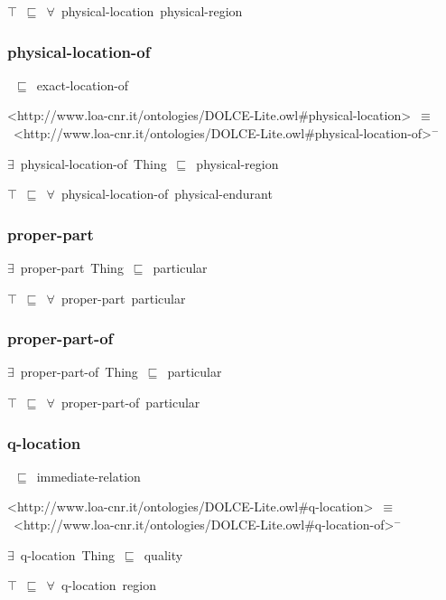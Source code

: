 \documentclass{article}
\begin{document}
\ensuremath{\top}~\ensuremath{\sqsubseteq}~\ensuremath{\forall}~physical-location~physical-region

\subsubsection*{physical-location-of}

~\ensuremath{\sqsubseteq}~exact-location-of

<http://www.loa-cnr.it/ontologies/DOLCE-Lite.owl#physical-location>~\ensuremath{\equiv}~<http://www.loa-cnr.it/ontologies/DOLCE-Lite.owl#physical-location-of>\ensuremath{^-}

\ensuremath{\exists}~physical-location-of~Thing~\ensuremath{\sqsubseteq}~physical-region

\ensuremath{\top}~\ensuremath{\sqsubseteq}~\ensuremath{\forall}~physical-location-of~physical-endurant

\subsubsection*{proper-part}

\ensuremath{\exists}~proper-part~Thing~\ensuremath{\sqsubseteq}~particular

\ensuremath{\top}~\ensuremath{\sqsubseteq}~\ensuremath{\forall}~proper-part~particular

\subsubsection*{proper-part-of}

\ensuremath{\exists}~proper-part-of~Thing~\ensuremath{\sqsubseteq}~particular

\ensuremath{\top}~\ensuremath{\sqsubseteq}~\ensuremath{\forall}~proper-part-of~particular

\subsubsection*{q-location}

~\ensuremath{\sqsubseteq}~immediate-relation

<http://www.loa-cnr.it/ontologies/DOLCE-Lite.owl#q-location>~\ensuremath{\equiv}~<http://www.loa-cnr.it/ontologies/DOLCE-Lite.owl#q-location-of>\ensuremath{^-}

\ensuremath{\exists}~q-location~Thing~\ensuremath{\sqsubseteq}~quality

\ensuremath{\top}~\ensuremath{\sqsubseteq}~\ensuremath{\forall}~q-location~region
\end{document}
